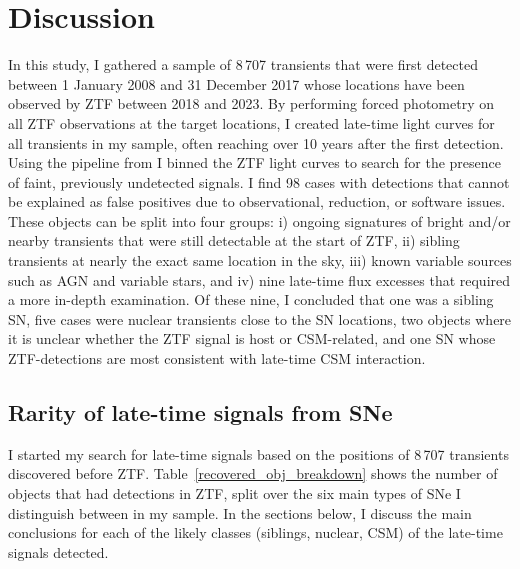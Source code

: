 \documentclass[a4paper,oneside,12pt, class=Latex/Classes/PhDthesisPSnPDF, crop=false]{standalone}
\begin{document}
\section{Discussion}
\label{Pre-ZTF_discussion}
In this study, I gathered a sample of 8\,707 transients that were first detected between 1 January 2008 and 31 December 2017 whose locations have been observed by ZTF between 2018 and 2023. By performing forced photometry on all ZTF observations at the target locations, I created late-time light curves for all transients in my sample, often reaching over 10 years after the first detection. Using the pipeline from \citet{Terwel_2024_paper1} I binned the ZTF light curves to search for the presence of faint, previously undetected signals. I find 98 cases with detections that cannot be explained as false positives due to observational, reduction, or software issues. These objects can be split into four groups: i) ongoing signatures of bright and/or nearby transients that were still detectable at the start of ZTF, ii) sibling transients at nearly the exact same location in the sky, iii) known variable sources such as AGN and variable stars, and iv) nine late-time flux excesses that required a more in-depth examination. Of these nine, I concluded that one was a sibling SN, five cases were nuclear transients close to the SN locations, two objects where it is unclear whether the ZTF signal is host or CSM-related, and one SN whose ZTF-detections are most consistent with late-time CSM interaction.


\subsection{Rarity of late-time signals from SNe}
I started my search for late-time signals based on the positions of 8\,707 transients discovered before ZTF. Table~\ref{recovered_obj_breakdown} shows the number of objects that had detections in ZTF, split over the six main types of SNe I distinguish between in my sample. In the sections below, I discuss the main conclusions for each of the likely classes (siblings, nuclear, CSM) of the late-time signals detected.
\end{document}
